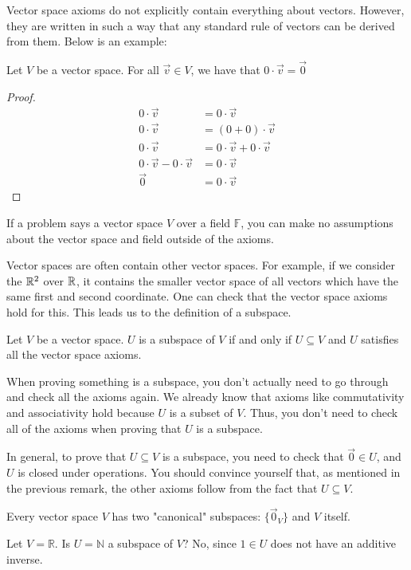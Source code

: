 Vector space axioms do not explicitly contain everything about vectors. However, they are written in such a way that any standard rule of vectors can be derived from them. Below is an example:
\begin{theorem}
    Let $V$ be a vector space. For all $\vec{v}\in V$, we have that $0\cdot\vec{v}=\vec{0}$
\end{theorem}
\begin{proof}
    \begin{align*}
        0\cdot\vec{v}&=0\cdot\vec{v}\\
        0\cdot\vec{v}&=(0+0)\cdot\vec{v}\tag{from Additive Identity}\\
        0\cdot\vec{v}&=0\cdot\vec{v}+0\cdot\vec{v}\tag{from Vector Over Scalar Distributivity}\\
        0\cdot\vec{v}-0\cdot\vec{v}&=0\cdot\vec{v}\\
        \vec{0}&=0\cdot\vec{v}\tag{from Additive Inverse}
    \end{align*}
\end{proof}
\begin{remark}
    If a problem says a vector space $V$ over a field $\mathbb{F}$, you can make no assumptions about the vector space and field outside of the axioms.
\end{remark}
Vector spaces are often contain other vector spaces. For example, if we consider the $\mathbb{R}^2$ over $\mathbb{R}$, it contains the smaller vector space of all vectors which have the same first and second coordinate. One can check that the vector space axioms hold for this. This leads us to the definition of a subspace.
\begin{definition}
    Let $V$ be a vector space. $U$ is a subspace of $V$ if and only if $U\subseteq V$ and $U$ satisfies all the vector space axioms.
\end{definition}
\begin{remark}
    When proving something is a subspace, you don't actually need to go through and check all the axioms again. We already know that axioms like commutativity and associativity hold because $U$ is a subset of $V$. Thus, you don't need to check all of the axioms when proving that $U$ is a subspace.
\end{remark}
In general, to prove that $U\subseteq V$ is a subspace, you need to check that $\vec{0}\in U$, and $U$ is closed under operations. You should convince yourself that, as mentioned in the previous remark, the other axioms follow from the fact that $U\subseteq V$.
\begin{remark}
    Every vector space $V$ has two "canonical" subspaces: $\{\vec{0}_V\}$ and $V$ itself.
\end{remark}
\begin{example}
    Let $V=\mathbb{R}$. Is $U=\mathbb{N}$ a subspace of $V$? No, since $1\in U$ does not have an additive inverse.
\end{example}

